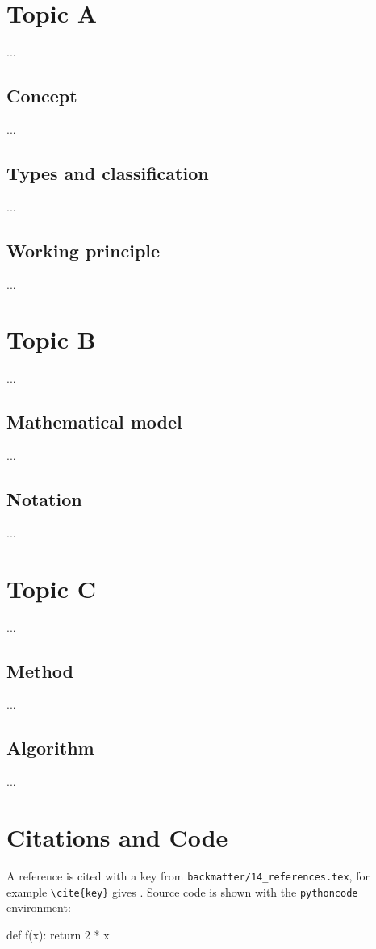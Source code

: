 \section{Topic A}
...

\subsection{Concept}
...

\subsection{Types and classification}
...

\subsection{Working principle}
...

\section{Topic B}
...

\subsection{Mathematical model}
...

\subsection{Notation}
...

\section{Topic C}
...

\subsection{Method}
...

\subsection{Algorithm}
...

\section{Citations and Code}
A reference is cited with a key from \texttt{backmatter/14\_references.tex}, for example \texttt{\textbackslash cite\{key\}} gives \cite{example_article}.
Source code is shown with the \texttt{pythoncode} environment:
\begin{pythoncode}
def f(x):
    return 2 * x
\end{pythoncode}

